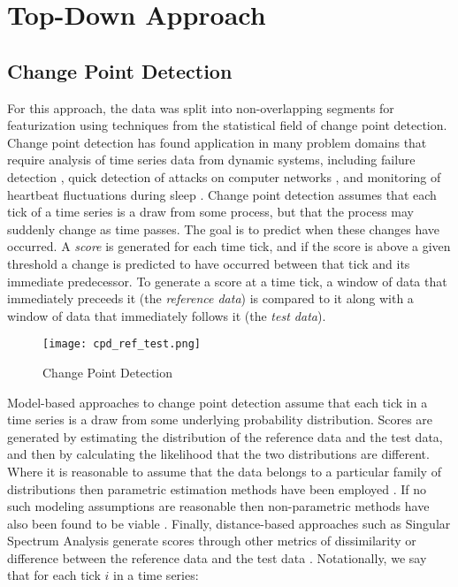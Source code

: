 \chapter{Top-Down Approach}
\section{Change Point Detection}
For this approach, the data was split into non-overlapping segments for
featurization using techniques from the statistical field of change point detection.
Change point detection has found application in many problem domains that require analysis of time series data
from dynamic systems, including failure detection \cite{bae13}, quick detection of
attacks on computer networks \cite{tartakovsky06}, and monitoring of heartbeat fluctuations during
sleep \cite{staudacher05}. Change point detection assumes that each tick of a time series is a draw from some
process, but that the process may suddenly change as time passes.
The goal is to predict when these changes have occurred.
A \emph{score} is generated for each time tick, and if the score is
above a given threshold a change is predicted to have occurred between that tick
and its immediate predecessor. To generate a score at
a time tick, a window of data that immediately preceeds it (the
\emph{reference data}) is compared to it along with a window of data that immediately follows it
(the \emph{test data}).

\begin{figure}
 \centering
 \texttt{[image: cpd\_ref\_test.png]}
 \caption{Change Point Detection}
 \label{fig:cpd_ref_test.png}
\end{figure}

Model-based approaches to change point detection assume that each tick in
a time series is a draw from some underlying probability distribution.
Scores are generated by estimating the distribution of the reference data
and the test data, and then by calculating the likelihood
that the two distributions are different.
Where it is reasonable to assume that the data belongs to a particular
family of distributions then parametric estimation methods have been employed
\cite{thatte11}. If no such modeling assumptions are reasonable then 
non-parametric methods have also been found to be viable \cite{matteson12}.
Finally, distance-based approaches such as Singular Spectrum Analysis
generate scores through other metrics of 
dissimilarity or difference between the reference data and the test data
\cite{moskvina03}.
Notationally, we say that for each tick $i$ in a time series:


